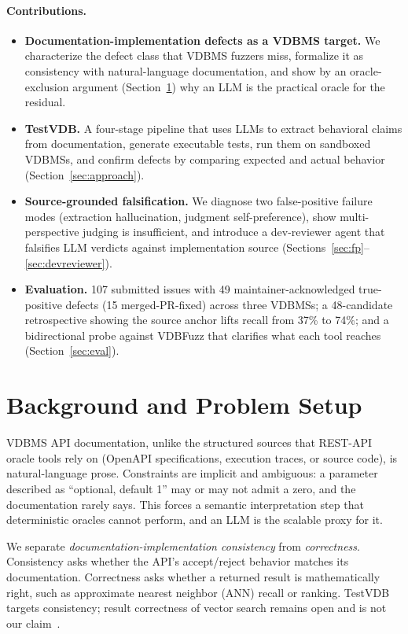 \documentclass[sigconf]{acmart}
\begin{document}
\paragraph{Contributions.}
\begin{itemize}
  \item \textbf{Documentation-implementation defects as a VDBMS target.} We characterize the defect class that VDBMS fuzzers miss, formalize it as consistency with natural-language documentation, and show by an oracle-exclusion argument (Section~\ref{sec:background}) why an LLM is the practical oracle for the residual.
  \item \textbf{TestVDB.} A four-stage pipeline that uses LLMs to extract behavioral claims from documentation, generate executable tests, run them on sandboxed VDBMSs, and confirm defects by comparing expected and actual behavior (Section~\ref{sec:approach}).
  \item \textbf{Source-grounded falsification.} We diagnose two false-positive failure modes (extraction hallucination, judgment self-preference), show multi-perspective judging is insufficient, and introduce a dev-reviewer agent that falsifies LLM verdicts against implementation source (Sections~\ref{sec:fp}--\ref{sec:devreviewer}).
  \item \textbf{Evaluation.} 107 submitted issues with 49 maintainer-acknowledged true-positive defects (15 merged-PR-fixed) across three VDBMSs; a 48-candidate retrospective showing the source anchor lifts recall from 37\% to 74\%; and a bidirectional probe against VDBFuzz that clarifies what each tool reaches (Section~\ref{sec:eval}).
\end{itemize}

\section{Background and Problem Setup}
\label{sec:background}

VDBMS API documentation, unlike the structured sources that REST-API oracle tools rely on (OpenAPI specifications, execution traces, or source code), is natural-language prose. Constraints are implicit and ambiguous: a parameter described as ``optional, default 1'' may or may not admit a zero, and the documentation rarely says. This forces a semantic interpretation step that deterministic oracles cannot perform, and an LLM is the scalable proxy for it.

We separate \emph{documentation-implementation consistency} from \emph{correctness}. Consistency asks whether the API's accept/reject behavior matches its documentation. Correctness asks whether a returned result is mathematically right, such as approximate nearest neighbor (ANN) recall or ranking. TestVDB targets consistency; result correctness of vector search remains open and is not our claim~\cite{roadmap25}.
\end{document}
